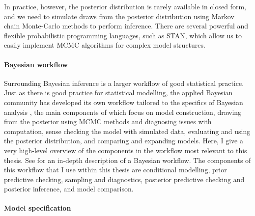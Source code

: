In practice, however, the posterior distribution is rarely available in closed form, and we need to simulate draws from the posterior distribution using Markov chain Monte-Carlo methods to perform inference. There are several powerful and flexible probabilistic programming languages, such as STAN, which allow us to easily implement MCMC algorithms for complex model structures.

\paragraph*{Bayesian workflow} \label{sec:bayesian-background}

Surrounding Bayesian inference is a larger workflow of good statistical practice. Just as there is good practice for statistical modelling, the applied Bayesian community has developed its own workflow tailored to the specifics of Bayesian analysis \citep{gelman_workflow_2020}, the main components of which focus on model construction, drawing from the posterior using MCMC methods and diagnosing issues with computation, sense checking the model with simulated data, evaluating and using the posterior distribution, and comparing and expanding models. Here, I give a very high-level overview of the components in the workflow most relevant to this thesis. See \citep{gelman_workflow_2020} for an in-depth description of a Bayesian workflow. The components of this workflow that I use within this thesis are conditional modelling, prior predictive checking, sampling and diagnostics, posterior predictive checking and posterior inference, and model comparison.

\paragraph*{Model specification}

